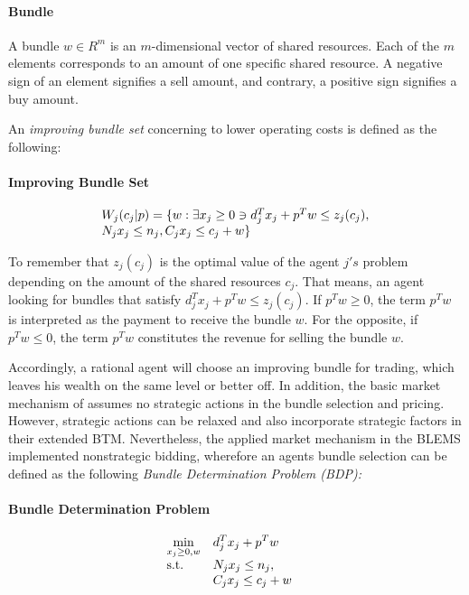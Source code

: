 \paragraph*{Bundle} A bundle $w \in R^{m}$ is an $m$-dimensional vector of shared resources. 
Each of the $m$ elements corresponds to an amount of one specific shared resource. 
A negative sign of an element signifies a sell amount, 
and contrary, a positive sign signifies a buy amount. \newline


An \textit{improving bundle set} concerning to lower operating costs is defined as the following:

\paragraph*{Improving Bundle Set}
\begin{equation}
 \begin{array}{ll@{}ll}
 W_{j}(c_{j}|p) = \{w: \exists x_{j} \geq 0 \ni d_{j}^{T}x_{j} + p^{T}w \leq z_{j}(c_{j}), \\
 N_{j}x_{j} \leq n_{j}, C_{j}x_{j} \leq c_{j}+w \}
 \end{array}
\end{equation}

To remember that $z_{j}(c_{j})$ is the optimal value of the agent $j's$ problem depending on the amount of the shared resources $c_{j}$. 
That means, an agent looking for bundles that satisfy 
$d_{j}^{T}x_{j} + p^{T}w \leq z_{j}(c_{j})$. If 
$p^{T}w \geq 0$, the term $p^{T}w$ is interpreted as the payment to receive the bundle $w$.
For the opposite, if $p^{T}w \leq 0$, the term $p^{T}w$ constitutes the revenue for selling the bundle $w$.


Accordingly, a rational agent will choose an improving bundle for trading, 
which leaves his wealth on the same level or better off. 
In addition, the basic market mechanism of  assumes no 
strategic actions in the bundle selection and pricing. However, strategic actions 
can be relaxed and  also incorporate strategic factors
in their extended BTM. 
Nevertheless, the applied market mechanism in the BLEMS implemented nonstrategic bidding, wherefore an agents bundle selection 
can be defined as the following \textit{Bundle Determination Problem (BDP):}

\paragraph*{Bundle Determination Problem}
\begin{equation}
 \begin{array}{ll@{}ll}
 \underset{x_{j} \geq 0, w}{\text{min}} & \displaystyle d^{T}_{j}x_{j} + p^{T}w &\\
 \text{s.t.}& \displaystyle N_{j}x_{j} \leq n_{j}, &&\\
 & \displaystyle C_{j}x_{j} \leq c_{j}+w
 \end{array}
\end{equation}

